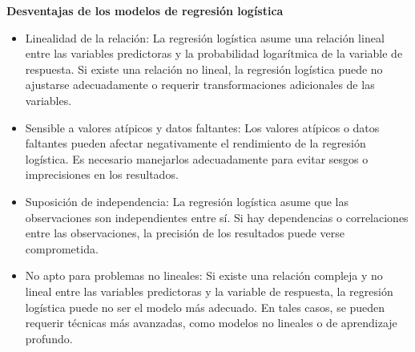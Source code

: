 \textbf{Desventajas de los modelos de regresión logística}

\begin{itemize}
    \item Linealidad de la relación: La regresión logística asume una relación lineal entre las variables predictoras y la probabilidad logarítmica de la variable de respuesta. Si existe una relación no lineal, la regresión logística puede no ajustarse adecuadamente o requerir transformaciones adicionales de las variables.
    \item Sensible a valores atípicos y datos faltantes: Los valores atípicos o datos faltantes pueden afectar negativamente el rendimiento de la regresión logística. Es necesario manejarlos adecuadamente para evitar sesgos o imprecisiones en los resultados.
    \item Suposición de independencia: La regresión logística asume que las observaciones son independientes entre sí. Si hay dependencias o correlaciones entre las observaciones, la precisión de los resultados puede verse comprometida.
    \item No apto para problemas no lineales: Si existe una relación compleja y no lineal entre las variables predictoras y la variable de respuesta, la regresión logística puede no ser el modelo más adecuado. En tales casos, se pueden requerir técnicas más avanzadas, como modelos no lineales o de aprendizaje profundo.
\end{itemize}